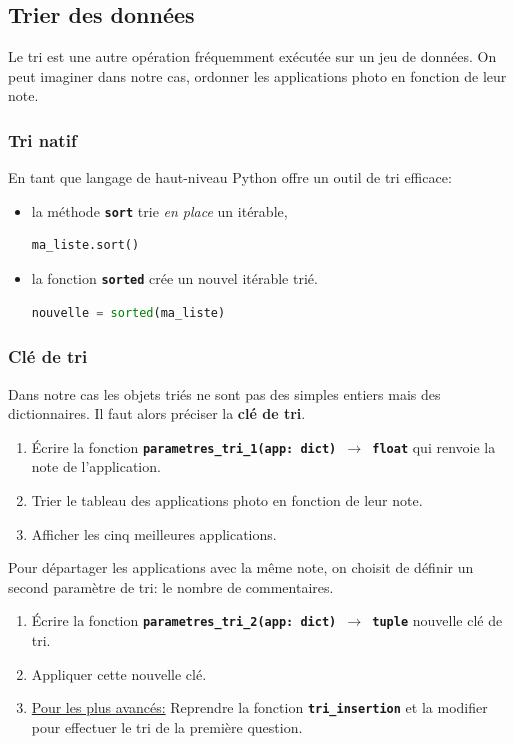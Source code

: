 \documentclass[a4paper,11pt]{article}
\begin{document}
\subsection{Trier des données}
Le tri est une autre opération fréquemment exécutée sur un jeu de données. On peut imaginer dans notre cas, ordonner les applications photo en fonction de leur note. 
\subsubsection{Tri natif}
En tant que langage de haut-niveau Python offre un outil de tri efficace:
\begin{itemize}
    \item la méthode \textbf{\texttt{sort}} trie \emph{en place} un itérable,
    \begin{center}
    \begin{lstlisting}[language=Python]
ma_liste.sort()
    \end{lstlisting}
    \end{center}
    \item la fonction \textbf{\texttt{sorted}} crée un nouvel itérable trié.
    \begin{center}
    \begin{lstlisting}[language=Python]
nouvelle = sorted(ma_liste)   
    \end{lstlisting}
    \end{center}
\end{itemize}
\subsubsection{Clé de tri}
Dans notre cas les objets triés ne sont pas des simples entiers mais des dictionnaires. Il faut alors préciser la \textbf{clé de tri}.

\begin{activite}
    \begin{enumerate}
        \item Écrire la fonction \textbf{\texttt{parametres\_tri\_1(app: dict) $\rightarrow$ float}} qui renvoie la note de l'application.
        \item Trier le tableau des applications photo en fonction de leur note.
        \item Afficher les cinq meilleures applications.
    \end{enumerate}
    Pour départager les applications avec la même note, on choisit de définir un second paramètre de tri: le nombre de commentaires.
    \begin{enumerate}[resume]
        \item Écrire la fonction \textbf{\texttt{parametres\_tri\_2(app: dict) $\rightarrow$ tuple}} nouvelle clé de tri.
        \item Appliquer cette nouvelle clé.
        \item \underline{Pour les plus avancés:} Reprendre la fonction \textbf{\texttt{tri\_insertion}} et la modifier pour effectuer le tri de la première question.
    \end{enumerate}
    \end{activite}
\end{document}
